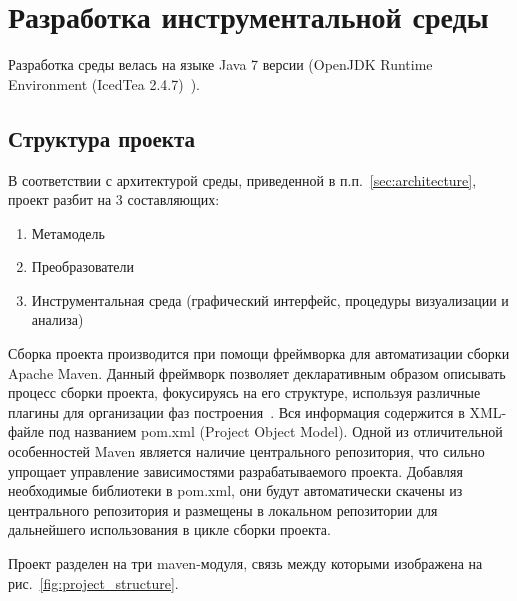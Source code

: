 \chapter{Разработка инструментальной среды}

Разработка среды велась на языке Java 7 версии (OpenJDK Runtime Environment
(IcedTea 2.4.7)~\cite{Gosling2013}).

\section{Структура проекта}

В соответствии с архитектурой среды, приведенной в п.п.~\ref{sec:architecture},
проект разбит на 3 составляющих:

\begin{enumerate}
    \item Метамодель
    \item Преобразователи
    \item Инструментальная среда (графический интерфейс, процедуры визуализации
    и анализа)
\end{enumerate}


Сборка проекта производится при помощи фреймворка для автоматизации сборки
Apache Maven. Данный фреймворк позволяет декларативным образом описывать процесс
сборки проекта, фокусируясь на его структуре, используя различные плагины для
организации фаз построения~\cite{Maven2001-2005}. Вся информация содержится в
XML-файле под названием pom.xml (Project Object Model). Одной из отличительной
особенностей Maven является наличие центрального репозитория, что сильно
упрощает управление зависимостями разрабатываемого проекта. Добавляя необходимые
библиотеки в pom.xml, они будут автоматически скачены из центрального
репозитория и размещены в локальном репозитории для дальнейшего использования в
цикле сборки проекта.

Проект разделен на три maven-модуля, связь между которыми изображена на
рис.~\ref{fig:project_structure}.

